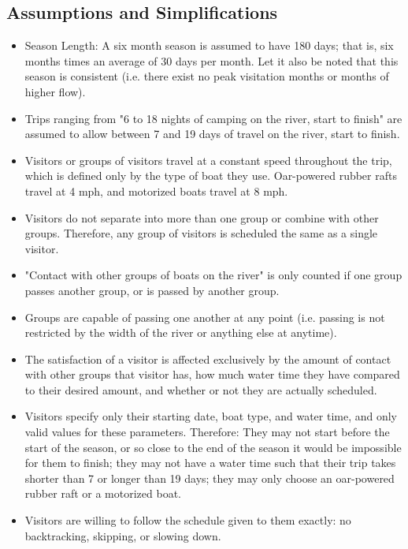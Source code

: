 \documentclass[11pt]{article} %
\begin{document}
\subsection{Assumptions and Simplifications}
\label{sec:assumptions}
\begin{itemize}
\item Season Length: A six month season is assumed to have 180 days; that is,
six months times an average of 30 days per month.  Let it also be noted that
this season is consistent (i.e. there exist no peak visitation months or
months of higher flow).

\item Trips ranging from "6 to 18 nights of camping on the river, start to
finish" are assumed to allow
between 7 and 19 days of travel on the river, start to finish.

\item Visitors or groups of visitors travel at a constant speed throughout the
trip, which is defined only by the type of boat they use. Oar-powered
rubber rafts travel at 4 mph, and motorized boats travel at 8 mph.

\item Visitors do not separate into more than one group or combine with other
groups. Therefore, any group of visitors is scheduled the same as a single
visitor.

\item "Contact with other groups of boats on the river" is only counted if
one group passes another group, or is passed by another group.

\item Groups are capable of passing one another at any point (i.e. passing is
not restricted by the width of the river or anything else at anytime).

\item The satisfaction of a visitor is affected exclusively by the amount of
contact with other groups that visitor has, how much water time they have
compared to their desired amount, and whether or not they
are actually scheduled.

\item Visitors specify only their starting date, boat type, and water time,
and only valid values for these parameters. Therefore: They may not start
before the start of the season, or so close to the end of the season it
would be impossible for them to finish; they may not have a water time
such that their trip takes shorter than 7 or longer than 19 days; they may
only choose an oar-powered rubber raft or a motorized boat.

\item Visitors are willing to follow the schedule given to them exactly:
no backtracking, skipping, or slowing down.
\end{itemize}
\end{document}
